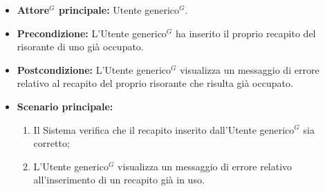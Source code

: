 \label{usecase:Errore registrazione recapito occupato}
\begin{itemize}

	\item \textbf{\gls{Attore}$^G$ principale:} \gls{Utente generico}$^G$.

	\item \textbf{Precondizione:} L'\gls{Utente generico}$^G$ ha inserito il proprio recapito del risorante di uno già occupato.
	
	\item \textbf{Postcondizione:} L'\gls{Utente generico}$^G$ visualizza un messaggio di errore relativo al recapito del proprio risorante che risulta già occupato.

	\item \textbf{Scenario principale:}
	\begin{enumerate}
        \item Il Sistema verifica che il recapito inserito dall'\gls{Utente generico}$^G$ sia corretto;
        \item L'\gls{Utente generico}$^G$ visualizza un messaggio di errore relativo all'inserimento di un recapito già in uso.
	\end{enumerate}
	
\end{itemize}